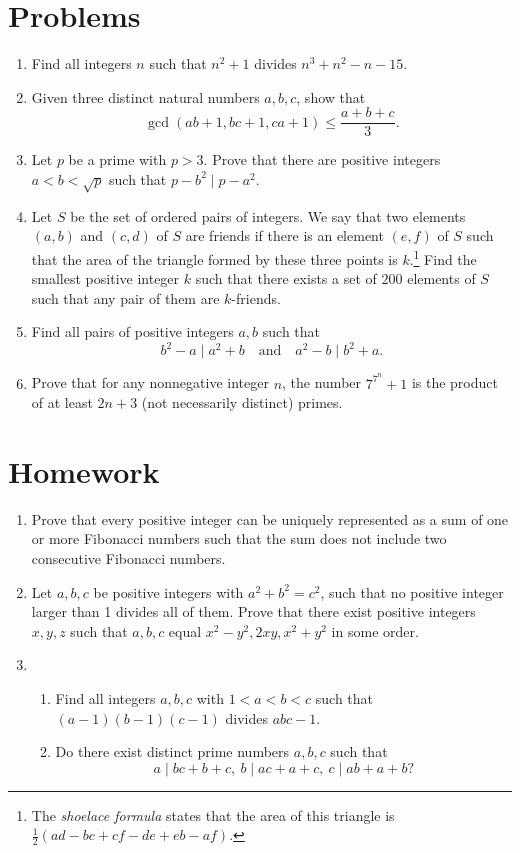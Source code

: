 \documentclass{article}
\begin{document}
\section{Problems}
  \begin{enumerate}
    \item Find all integers $n$ such that $n^2+1$ divides $n^3+n^2-n-15$.
    \item Given three distinct natural numbers $a,b,c$, show that
      \[\gcd(ab+1,bc+1,ca+1)\le\frac{a+b+c}3.\]
    \item Let $p$ be a prime with $p>3$. Prove that there are positive integers
      $a<b<\sqrt p$ such that $p-b^2\mid p-a^2$.
    \item Let $S$ be the set of ordered pairs of integers. We say that two
      elements $(a,b)$ and $(c,d)$ of $S$ are friends if there is an element
      $(e,f)$ of $S$ such that the area of the triangle formed by these three
      points is $k$.\footnote{The \emph{shoelace formula} states that the area
      of this triangle is $\frac12(ad-bc+cf-de+eb-af)$.}
      Find the smallest positive integer $k$ such that there exists a set of
      $200$ elements of $S$ such that any pair of them are $k$-friends.
    \item Find all pairs of positive integers $a,b$ such that \[b^2-a\mid
        a^2+b\quad\text{and}\quad a^2-b\mid b^2+a.\]
    \item Prove that for any nonnegative integer $n$, the number $7^{7^n}+1$ is
      the product of at least $2n+3$ (not necessarily distinct) primes.
  \end{enumerate}
\newpage
\section{Homework}
  \begin{enumerate}
    \item Prove that every positive integer can be uniquely represented as a sum
      of one or more Fibonacci numbers such that the sum does not include two
      consecutive Fibonacci numbers.
    \item Let $a, b, c$ be positive integers with $a^2+b^2=c^2$, such that no
      positive integer larger than 1 divides all of them. Prove that
      there exist positive integers $x,y,z$ such that $a,b,c$ equal
      $x^2-y^2,2xy,x^2+y^2$ in some order.
    \item
      \begin{enumerate}
        \item Find all integers $a,b,c$ with $1<a<b<c$ such that $(a-1)(b-1)(c-1)$
          divides $abc-1$.
        \item Do there exist distinct prime numbers $a,b,c$ such that
          \[a\mid bc+b+c,\ b\mid ac+a+c,\ c\mid ab+a+b?\]
      \end{enumerate}
  \end{enumerate}
\end{document}
